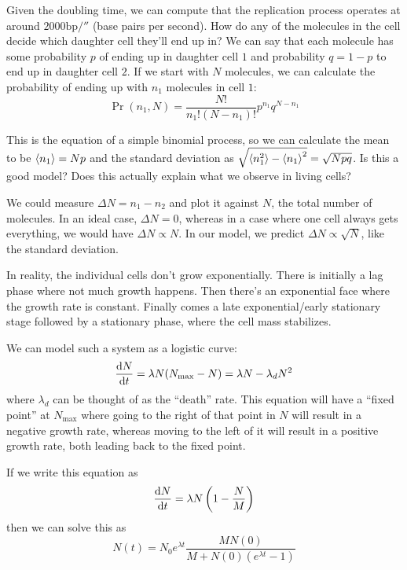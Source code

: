 \documentclass[a4paper,twoside,master.tex]{subfiles}
\begin{document}
Given the doubling time, we can compute that the replication process operates at around $ 2000 \text{bp}/\second $ (base pairs per second). How do any of the molecules in the cell decide which daughter cell they'll end up in? We can say that each molecule has some probability $ p $ of ending up in daughter cell $ 1 $ and probability $ q = 1 - p $ to end up in daughter cell $ 2 $. If we start with $ N $ molecules, we can calculate the probability of ending up with $ n_1 $ molecules in cell $ 1 $:
\begin{equation}
    \Pr(n_1, N) = \frac{N!}{n_1!(N - n_1)!} p^{n_1} q^{N-n_1}
\end{equation}

This is the equation of a simple binomial process, so we can calculate the mean to be $ \ev{n_1} = Np $ and the standard deviation as $ \sqrt{\ev{n_1^2} - \ev{n_1}^2} = \sqrt{Npq} $. Is this a good model? Does this actually explain what we observe in living cells?

We could measure $ \Delta N = n_1 - n_2 $ and plot it against $ N $, the total number of molecules. In an ideal case, $ \Delta N = 0 $, whereas in a case where one cell always gets everything, we would have $ \Delta N \propto N $. In our model, we predict $ \Delta N \propto \sqrt{N} $, like the standard deviation.


In reality, the individual cells don't grow exponentially. There is initially a lag phase where not much growth happens. Then there's an exponential face where the growth rate is constant. Finally comes a late exponential/early stationary stage followed by a stationary phase, where the cell mass stabilizes.


We can model such a system as a logistic curve:
\begin{equation}
    \dv{N}{t} = \lambda N(N_{\text{max}} - N) = \lambda N - \lambda_d N^2
\end{equation}
where $ \lambda_d $ can be thought of as the ``death'' rate. This equation will have a ``fixed point'' at $ N_{\text{max}} $ where going to the right of that point in $ N $ will result in a negative growth rate, whereas moving to the left of it will result in a positive growth rate, both leading back to the fixed point.

If we write this equation as
\begin{equation}
    \dv{N}{t}= \lambda N \left( 1 - \frac{N}{M} \right)
\end{equation}
then we can solve this as
\begin{equation}
    N(t) = N_0 e^{\lambda t} \frac{MN(0)}{M + N(0) (e^{\lambda t} - 1)}
\end{equation}
\end{document}
